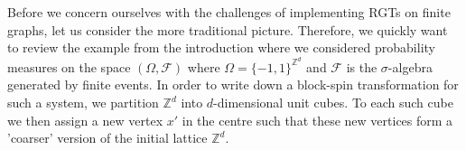 \documentclass{article}
\begin{document}
Before we concern ourselves with the challenges of implementing RGTs on finite graphs, let us consider the more traditional picture. Therefore, we quickly want to review the example from the introduction where we considered probability measures on the space $(\Omega,\mathscr{F})$ where $\Omega=\{-1,1\}^{\mathds{Z}^d}$ and $\mathscr{F}$ is the $\sigma$-algebra generated by finite events. In order to write down a block-spin transformation for such a system, we partition $\mathds{Z}^d$ into $d$-dimensional unit cubes. To each such cube we then assign a new vertex $x'$ in the centre such that these new vertices form a 'coarser' version of the initial lattice $\mathds{Z}^d$. 

\begin{figure}[h!]
    \centering
    \centering
\end{figure}
\end{document}
